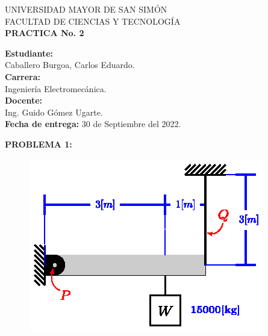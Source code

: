\documentclass[letter,10pt,twoside]{article}
\newcommand{\blankpage}{
\newpage
\thispagestyle{empty}
\mbox{}
\newpage
}
\begin{document}
\begin{titlepage}
\begin{center}
{\Large UNIVERSIDAD MAYOR DE SAN SIMÓN}\\
\vspace*{0.15cm}
{\large FACULTAD DE CIENCIAS Y TECNOLOGÍA}\\
\vspace*{9.0cm}
{\Large \textbf{PRACTICA No. 2}}\\
\end{center}

\vspace*{7.4cm}
\leftskip=7.95cm
\noindent
\textbf{Estudiante:}\\
Caballero Burgoa, Carlos Eduardo.\\
\textbf{Carrera:}\\
Ingeniería Electromecánica.\\
\newline
\textbf{Docente:}\\
Ing. Guido Gómez Ugarte.\\
\newline
\textbf{Fecha de entrega:} 30 de Septiembre del 2022.\\

\end{titlepage}

\blankpage

\colorbox{blue!25}{\textbf{PROBLEMA 1:}}

\begin{figure}[H]
\centering
\includegraphics[scale=1.8]{resources/f01.eps}
\end{figure}
\end{document}
